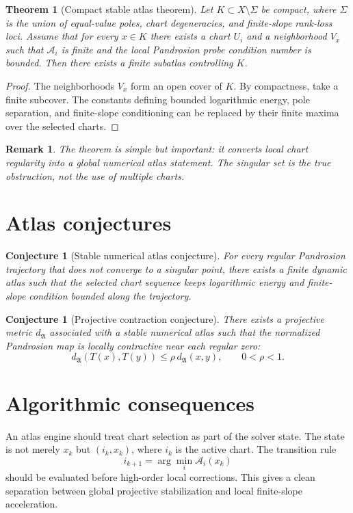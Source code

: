 \documentclass[11pt]{article}
\newtheorem{theorem}[definition]{Theorem}
\newtheorem{conjecture}[definition]{Conjecture}
\newtheorem{remark}[definition]{Remark}
\newcommand{\A}{\mathcal{A}}
\begin{document}
\begin{theorem}[Compact stable atlas theorem]
Let $K\subset X\setminus\Sigma$ be compact, where $\Sigma$ is the union of equal-value poles, chart degeneracies, and finite-slope rank-loss loci. Assume that for every $x\in K$ there exists a chart $U_i$ and a neighborhood $V_x$ such that $\A_i$ is finite and the local Pandrosion probe condition number is bounded. Then there exists a finite subatlas controlling $K$.
\end{theorem}

\begin{proof}
The neighborhoods $V_x$ form an open cover of $K$. By compactness, take a finite subcover. The constants defining bounded logarithmic energy, pole separation, and finite-slope conditioning can be replaced by their finite maxima over the selected charts.
\end{proof}

\begin{remark}
The theorem is simple but important: it converts local chart regularity into a global numerical atlas statement. The singular set is the true obstruction, not the use of multiple charts.
\end{remark}

\section{Atlas conjectures}
\begin{conjecture}[Stable numerical atlas conjecture]
For every regular Pandrosion trajectory that does not converge to a singular point, there exists a finite dynamic atlas such that the selected chart sequence keeps logarithmic energy and finite-slope condition bounded along the trajectory.
\end{conjecture}

\begin{conjecture}[Projective contraction conjecture]
There exists a projective metric $d_{\mathfrak A}$ associated with a stable numerical atlas such that the normalized Pandrosion map is locally contractive near each regular zero:
\begin{equation}
    d_{\mathfrak A}(T(x),T(y))\le \rho\,d_{\mathfrak A}(x,y),\qquad 0<\rho<1.
\end{equation}
\end{conjecture}

\section{Algorithmic consequences}
An atlas engine should treat chart selection as part of the solver state. The state is not merely $x_k$ but $(i_k,x_k)$, where $i_k$ is the active chart. The transition rule
\begin{equation}
    i_{k+1}=\arg\min_i \A_i(x_k)
\end{equation}
should be evaluated before high-order local corrections. This gives a clean separation between global projective stabilization and local finite-slope acceleration.
\end{document}
